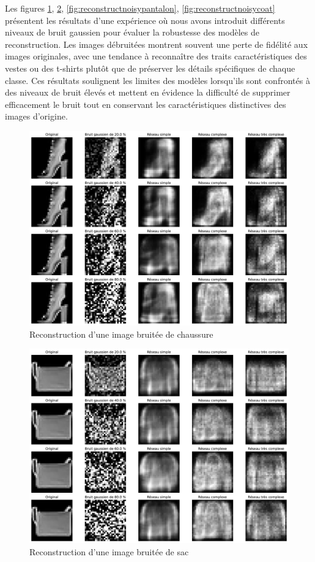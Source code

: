 \documentclass{article}
\begin{document}
Les figures \ref{fig:reconstructnoisychaussure}, \ref{fig:reconstructnoisybag}, \ref{fig:reconstructnoisypantalon}, \ref{fig:reconstructnoisycoat} présentent les résultats d'une expérience où nous avons introduit différents niveaux de bruit gaussien pour évaluer la robustesse des modèles de reconstruction. Les images débruitées montrent souvent une perte de fidélité aux images originales, avec une tendance à reconnaître des traits caractéristiques des vestes ou des t-shirts plutôt que de préserver les détails spécifiques de chaque classe. Ces résultats soulignent les limites des modèles lorsqu'ils sont confrontés à des niveaux de bruit élevés et mettent en évidence la difficulté de supprimer efficacement le bruit tout en conservant les caractéristiques distinctives des images d'origine.

\begin{figure}[htbp]
    \centering
    \includegraphics*[width=\textwidth]{reconstruct_noisy_chaussure.pdf}
    \caption{Reconstruction d'une image bruitée de chaussure}
    \label{fig:reconstructnoisychaussure}
\end{figure}

\begin{figure}[htbp]
    \centering
    \includegraphics*[width=\textwidth]{reconstruct_noisy_sac.pdf}
    \caption{Reconstruction d'une image bruitée de sac}
    \label{fig:reconstructnoisybag}
\end{figure}
\end{document}
